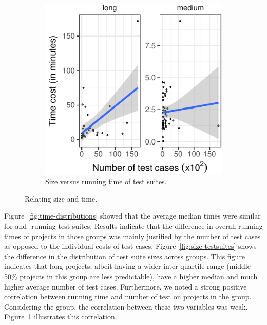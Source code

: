 \begin{figure}[t]
\begin{subfigure}{0.3\textwidth}
    \includegraphics[width=.95\textwidth]{plots/scatter-testcost.pdf}
    \caption{\label{fig:scattercost}Size versus running time of
      test suites.}
  \end{subfigure}
  \caption{\label{fig:time-versus-size}Relating size and time.}%
\end{figure}


Figure~\ref{fig:time-distributions} showed that the average median
times were similar for \medg{} and \longg{}-running test suites.
Results indicate that the difference in overall running times of
projects in those groups was mainly justified by the number of test
cases as opposed to the individual costs of test cases.
Figure~\ref{fig:size-testsuites} shows the difference in the
distribution of test suite sizes across groups.  This figure indicates
that long projects, albeit having a wider inter-quartile range (middle
50\% projects in this group are less predictable), have a higher
median and much higher average number of test cases.  Furthermore, we
noted a strong positive correlation between running time and number of
test on projects in the \longg{} group.  Considering the \medg{}
group, the correlation between these two variables was weak.
Figure~\ref{fig:scattercost} illustrates this correlation.


